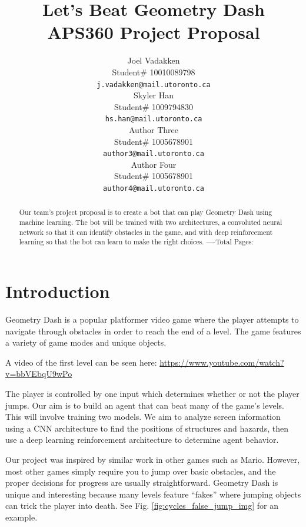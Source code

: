 \documentclass{article} %
\title{Let's Beat Geometry Dash  \\ 
APS360 Project Proposal}
\author{Joel Vadakken  \\
Student\# 10010089798\\
\texttt{j.vadakken@mail.utoronto.ca} \\
\And
Skyler Han  \\
Student\# 1009794830 \\
\texttt{hs.han@mail.utoronto.ca} \\
\AND
Author Three  \\
Student\# 1005678901 \\
\texttt{author3@mail.utoronto.ca} \\
\And
Author Four \\
Student\# 1005678901 \\
\texttt{author4@mail.utoronto.ca} \\
\AND
}
\begin{document}
\maketitle

\begin{abstract}
Our team's project proposal is to create a bot that can play 
Geometry Dash using machine learning. The bot will be trained
with two architectures, a convoluted neural network so that it
can identify obstacles in the game, and with deep reinforcement
learning so that the bot can learn to make the right choices.
----Total Pages: \pageref{last_page}
\end{abstract}



\section{Introduction}

Geometry Dash is a popular platformer video game 
where the player attempts to navigate through 
obstacles in order to reach the end of a level. 
The game features a variety of game modes and 
unique objects.

A video of the first level can be seen here:
\href{https://www.youtube.com/watch?v=bbVEbqU9wPo}{https://www.youtube.com/watch?v=bbVEbqU9wPo} 

The player is controlled by one input which 
determines whether or not the player jumps. 
Our aim is to build an agent that can beat many 
of the game’s levels. This will involve training 
two models. We aim to analyze screen information 
using a CNN architecture to find the positions 
of structures and hazards, then use a deep 
learning reinforcement architecture to determine 
agent behavior.

Our project was inspired by similar work in other
games such as Mario. However, most other games 
simply require you to jump over basic obstacles,
and the proper decisions for progress are usually 
straightforward. Geometry Dash is unique and 
interesting because many levels feature “fakes” 
where jumping objects can trick the player into death.
See Fig. \ref{fig:cycles_false_jump_img} for an example. 
\end{document}
